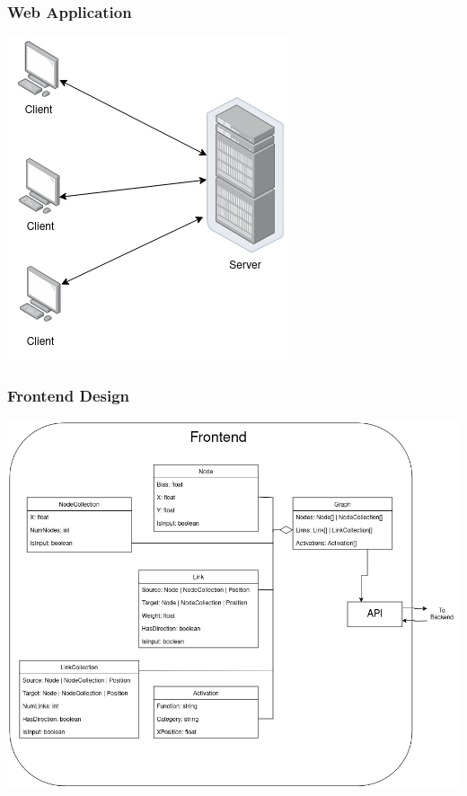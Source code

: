 \documentclass{beamer}
\begin{document}
\begin{frame}
    \frametitle{Web Application} 
    \centering
    \includegraphics[scale=0.5]{res/client_server.png}
\end{frame}

\begin{frame}
    \frametitle{Frontend Design} 
    \centering
    \includegraphics[scale=0.25]{../../docs/diagrams/class_diagram_frontend.png}
\end{frame}
\end{document}
